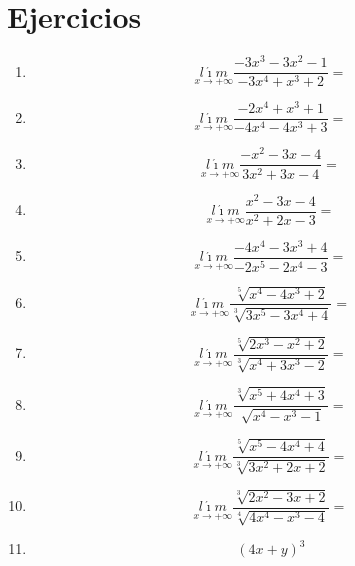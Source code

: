 \documentclass[oneside,spanish,letter]{article}
\begin{document}
\section{Ejercicios}
\begin{enumerate}
 \item $$\underset{x\rightarrow +\infty}{l\acute{\imath}m} \frac{-3x^3-3x^2-1}{-3x^4+x^3+2}=$$
 \item $$\underset{x\rightarrow +\infty}{l\acute{\imath}m} \frac{-2x^4+x^3+1}{-4x^4-4x^3+3}=$$
 \item $$\underset{x\rightarrow +\infty}{l\acute{\imath}m} \frac{-x^2-3x-4}{3x^2+3x-4}=$$
 \item $$\underset{x\rightarrow +\infty}{l\acute{\imath}m} \frac{x^2-3x-4}{x^2+2x-3}=$$
 \item $$\underset{x\rightarrow +\infty}{l\acute{\imath}m} \frac{-4x^4-3x^3+4}{-2x^5-2x^4-3}=$$
 \item $$\underset{x\rightarrow +\infty}{l\acute{\imath}m} \frac{\sqrt[5]{x^4-4x^3+2}}{\sqrt[3]{3x^5-3x^4+4}}=$$
 \item $$\underset{x\rightarrow +\infty}{l\acute{\imath}m} \frac{\sqrt[5]{2x^3-x^2+2}}{\sqrt[3]{x^4+3x^3-2}}=$$
 \item $$\underset{x\rightarrow +\infty}{l\acute{\imath}m} \frac{\sqrt[3]{x^5+4x^4+3}}{\sqrt[]{x^4-x^3-1}}=$$
 \item $$\underset{x\rightarrow +\infty}{l\acute{\imath}m} \frac{\sqrt[5]{x^5-4x^4+4}}{\sqrt[3]{3x^2+2x+2}}=$$
 \item $$\underset{x\rightarrow +\infty}{l\acute{\imath}m} \frac{\sqrt[3]{2x^2-3x+2}}{\sqrt[4]{4x^4-x^3-4}}=$$
\item $$(4x+y)^3$$
 \end{enumerate}
  \newpage
\end{document}
